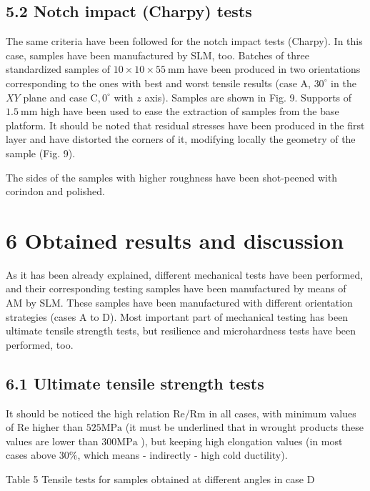 \documentclass[10pt]{article}
\begin{document}
\subsection*{5.2 Notch impact (Charpy) tests}
The same criteria have been followed for the notch impact tests (Charpy). In this case, samples have been manufactured by SLM, too. Batches of three standardized samples of $10 \times 10 \times 55 \mathrm{~mm}$ have been produced in two orientations corresponding to the ones with best and worst tensile results (case A, $30^{\circ}$ in the $X Y$ plane and case $\mathrm{C}, 0^{\circ}$ with $z$ axis). Samples are shown in Fig. 9. Supports of $1.5 \mathrm{~mm}$ high have been used to ease the extraction of samples from the base platform. It should be noted that residual stresses have been produced in the first layer and have distorted the corners of it, modifying locally the geometry of the sample (Fig. 9).

The sides of the samples with higher roughness have been shot-peened with corindon and polished.

\section*{6 Obtained results and discussion}
As it has been already explained, different mechanical tests have been performed, and their corresponding testing samples have been manufactured by means of AM by SLM. These samples have been manufactured with different orientation strategies (cases A to D). Most important part of mechanical testing has been ultimate tensile strength tests, but resilience and microhardness tests have been performed, too.

\subsection*{6.1 Ultimate tensile strength tests}
It should be noticed the high relation $\mathrm{Re} / \mathrm{Rm}$ in all cases, with minimum values of Re higher than $525 \mathrm{MPa}$ (it must be underlined that in wrought products these values are lower than $300 \mathrm{MPa}$ ), but keeping high elongation values (in most cases above $30 \%$, which means - indirectly - high cold ductility).

Table 5 Tensile tests for samples obtained at different angles in case D
\end{document}
